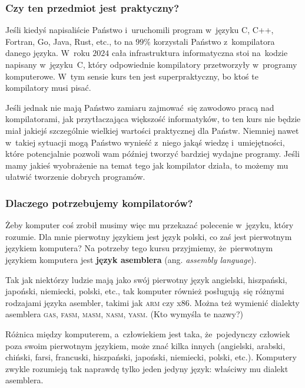 \documentclass[10pt,t]{beamer}
\begin{document}
\begin{frame}
  \frametitle{Czy ten przedmiot jest praktyczny?}


  Jeśli kiedyś napisaliście Państwo i~uruchomili program w~języku C, C++,
  Fortran, Go, Java, Rust, etc., to na $99\%$ korzystali Państwo
  z~kompilatora danego języka. W~roku $2024$ cała infrastruktura
  informatyczna stoi na~kodzie napisany w~języku~C, który odpowiednie
  kompilatory przetworzyły w~programy komputerowe. W~tym sensie kurs ten
  jest superpraktyczny, bo ktoś te kompilatory musi pisać.

  Jeśli jednak nie mają Państwo zamiaru zajmować~się zawodowo pracą nad
  kompilatorami, jak przytłaczająca większość informatyków, to ten kurs nie
  będzie miał jakiejś szczególnie wielkiej wartości praktycznej dla Państw.
  Niemniej nawet w~takiej sytuacji mogą Państwo wynieść z~niego jakąś
  wiedzę i~umiejętności, które potencjalnie pozwoli wam później tworzyć
  bardziej wydajne programy. Jeśli mamy jakieś wyobrażenie na temat tego
  jak kompilator działa, to możemy mu ułatwić tworzenie dobrych programów.

\end{frame}





\begin{frame}
  \frametitle{Dlaczego potrzebujemy kompilatorów?}

  \pause


  Żeby komputer coś zrobił musimy więc mu przekazać polecenie w~języku,
  który rozumie. Dla mnie pierwotny językiem jest język polski, co zaś
  jest pierwotnym językiem komputera? Na potrzeby tego kursu przyjmiemy,
  że~pierwotnym językiem komputera jest \textbf{język asemblera}
  (ang. \textit{assembly language}).

  Tak jak niektórzy ludzie mają jako swój pierwotny język angielski,
  hiszpański, japoński, niemiecki, polski, etc., tak komputer również
  posługują~się różnymi rodzajami języka asembler, takimi jak \textsc{arm}
  czy x86. Można też wymienić dialekty asemblera \textsc{gas},
  \textsc{fasm}, \textsc{masm}, \textsc{nasm}, \textsc{yasm}. (Kto wymyśla
  te nazwy?)

  Różnica między komputerem, a~człowiekiem jest taka, że~pojedynczy człowiek
  poza swoim pierwotnym językiem, może znać kilka innych (angielski,
  arabski, chiński, farsi, francuski, hiszpański, japoński, niemiecki,
  polski, etc.). Komputery zwykle rozumieją tak naprawdę tylko
  \alert{jeden jedyny} język: właściwy mu dialekt asemblera.

\end{frame}
\end{document}
